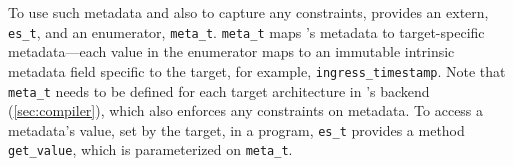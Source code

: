 \documentclass[letterpaper,twocolumn,10pt]{article}
\begin{document}
To use such metadata and also to capture any constraints, \uarch
provides an extern, \texttt{es\_t}, and an enumerator,
\texttt{meta\_t}. \texttt{meta\_t} maps \uarch's metadata to
target-specific metadata---each value in the enumerator maps to an
immutable intrinsic metadata field specific to the target, for
example, \texttt{ingress\_timestamp}. Note that \texttt{meta\_t} needs
to be defined for each target architecture in \ucomp's backend
(\cref{sec:compiler}), which also enforces any constraints on
metadata. To access a metadata's value, set by the target, in a
program, \texttt{es\_t} provides a method \texttt{get\_value}, which
is parameterized on \texttt{meta\_t}.
% 
% 
% 
\end{document}
